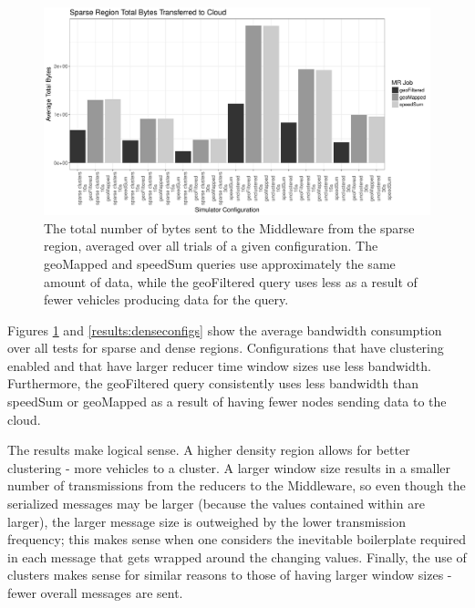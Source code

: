 \documentclass{thesis}
\begin{document}
    \begin{figure}
            \includegraphics[width=\textwidth]{binImages/sparseConfigs.pdf}
            \caption{The total number of bytes sent to the Middleware from the sparse region, averaged over all trials of a given configuration.
                The geoMapped and speedSum queries use approximately the same amount of data, while the geoFiltered
                query uses less as a result of fewer vehicles producing data for the query.}
            \label{results:sparseconfigs}
    \end{figure}

    Figures \ref{results:sparseconfigs} and \ref{results:denseconfigs} show the average bandwidth consumption over
    all tests for sparse and dense regions. Configurations that have clustering enabled and that have larger
    reducer time window sizes use less bandwidth. Furthermore, the geoFiltered query consistently uses less bandwidth
    than speedSum or geoMapped as a result of having fewer nodes sending data to the cloud.

    The results make logical sense. A higher density region allows for better clustering - more vehicles to a cluster.
    A larger window size results in a smaller number of transmissions from the reducers to the Middleware, so even
    though the serialized messages may be larger (because the values contained within are larger), the larger message
    size is outweighed by the lower transmission frequency; this makes sense when one considers the inevitable boilerplate
    required in each message that gets wrapped around the changing values. Finally, the use of clusters makes sense for
    similar reasons to those of having larger window sizes - fewer overall messages are sent.

\end{document}
